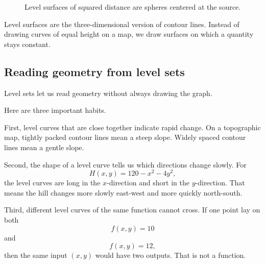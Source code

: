 \begin{figure}[h]
\centering
{}
\caption{Level surfaces of squared distance are spheres centered at the source.}
\end{figure}

Level surfaces are the three-dimensional version of contour lines.  Instead of drawing
curves of equal height on a map, we draw surfaces on which a quantity stays constant.

\subsection{Reading geometry from level sets}

Level sets let us read geometry without always drawing the graph.

Here are three important habits.

First, level curves that are close together indicate rapid change.  On a topographic
map, tightly packed contour lines mean a steep slope.  Widely spaced contour lines mean
a gentle slope.

Second, the shape of a level curve tells us which directions change slowly.  For
\[
    H(x,y)=120-x^2-4y^2,
\]
the level curves are long in the \(x\)-direction and short in the \(y\)-direction.  That
means the hill changes more slowly east-west and more quickly north-south.

Third, different level curves of the same function cannot cross.  If one point lay on
both
\[
    f(x,y)=10
\]
and
\[
    f(x,y)=12,
\]
then the same input \((x,y)\) would have two outputs.  That is not a function.

